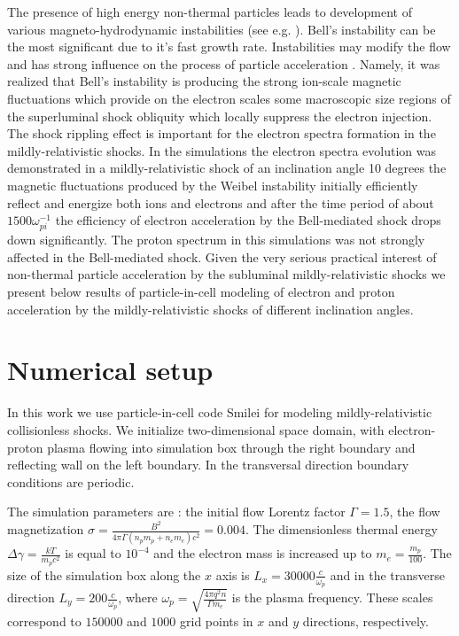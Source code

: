 \documentclass[a4paper]{jpconf}
\begin{document}
	The presence of high energy non-thermal particles leads to development of various magneto-hydrodynamic instabilities (see e.g. \cite{MD2001,Amato09,Bykov2013}). Bell's instability \cite{Bell04} can be the most significant due to it's fast growth rate. Instabilities may modify the flow and has strong influence on the process of particle acceleration \cite{Crumley2019,2021MNRAS.501.4837L,2021MNRAS.502.5065L}. Namely, it was realized that Bell's instability is producing the strong ion-scale magnetic fluctuations which 
	provide on the electron scales some macroscopic size regions of the superluminal shock obliquity which locally suppress the electron injection. The shock rippling effect is important for the electron spectra formation in the mildly-relativistic shocks.
	In the simulations \cite{Crumley2019} the electron spectra evolution was demonstrated in a mildly-relativistic shock   of an inclination angle 10 degrees the magnetic fluctuations produced by the Weibel instability initially efficiently reflect and energize both ions and electrons and after the time period of about $1500 \omega_{pi}^{-1}$  the efficiency of electron acceleration by the Bell-mediated shock drops down significantly. The proton spectrum in this simulations was not strongly affected in the Bell-mediated shock.   Given the very serious practical interest of non-thermal particle acceleration by the subluminal mildly-relativistic shocks we present below results of particle-in-cell modeling of electron and proton acceleration by the mildly-relativistic shocks of different inclination angles. 
	
	
	\section{Numerical setup}
	In this work we use particle-in-cell code Smilei \cite{Smilei18} for modeling mildly-relativistic collisionless shocks. We initialize two-dimensional space domain, with electron-proton plasma flowing into simulation box through the right boundary and reflecting wall on the left boundary. In the transversal direction boundary conditions are periodic.
	
	The simulation parameters are : the initial flow Lorentz factor $\Gamma = 1.5$, the flow magnetization $\sigma = \frac{B^2}{4\pi\Gamma (n_p m_p + n_e m_e) c^2} = 0.004$. The dimensionless thermal energy $\Delta \gamma = \frac{k T}{m_p c^2}$ is equal to $10^{-4}$ and the electron mass is increased up to $m_e = \frac{m_p}{100}$. The size of the simulation box along the $x$ axis is $L_x = 30000\frac{c}{\omega_p}$ and in the transverse direction $L_y = 200\frac{c}{\omega_p}$, where $\omega_p = \sqrt{\frac{4\pi q^2 n}{\Gamma m_e}}$ is the plasma frequency. These scales correspond to $150000$ and $1000$ grid points in $x$ and $y$ directions, respectively. 
	
\end{document}
